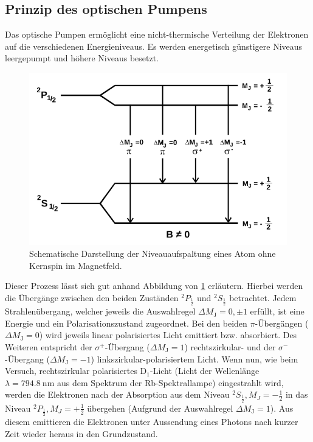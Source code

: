 \subsection{Prinzip des optischen Pumpens}
Das optische Pumpen ermöglicht eine nicht-thermische Verteilung der
Elektronen auf die verschiedenen Energieniveaus. Es werden energetisch
günstigere Niveaus leergepumpt und höhere Niveaus besetzt.
\begin{figure}
  \centering
  \includegraphics[width=0.9\columnwidth]{pictures/niveaus.png}
  \caption{Schematische Darstellung der Niveauaufspaltung eines Atom ohne Kernspin im Magnetfeld.\cite{Anleitung}}
  \label{fig:übergaenge_alkali}
\end{figure}
Dieser Prozess lässt sich gut anhand Abbildung von \ref{fig:übergaenge_alkali}
erläutern.
Hierbei werden die Übergänge zwischen den beiden Zuständen $^2P_{\frac{1}{2}}$ und $^2S_{\frac{1}{2}}$ betrachtet.
Jedem Strahlenübergang, welcher jeweils die Auswahlregel $\Delta M_{\mathrm{J}} = 0, \pm 1$ erfüllt, ist eine Energie und ein Polarisationszustand zugeordnet.
Bei den beiden $\pi$-Übergängen ($\Delta M_{\mathrm{J}} = 0$) wird jeweils linear polarisiertes Licht
emittiert bzw. absorbiert. Des Weiteren entspricht der $\sigma^+$-Übergang ($\Delta M_{\mathrm{J}} = 1$)
rechtszirkular- und der $\sigma^-$-Übergang ($\Delta M_{\mathrm{J}} = -1$) linkszirkular-polarisiertem Licht.
Wenn nun, wie beim Versuch, rechtszirkular polarisiertes D$_1$-Licht (Licht der Wellenlänge $\lambda= \SI{794.8}{\nano\meter}$ aus dem Spektrum der Rb-Spektrallampe)
eingestrahlt wird, werden die Elektronen nach der Absorption aus
dem Niveau $^2S_{\frac{1}{2}}, M_J = -\frac{1}{2}$ in das Niveau
$^2P_{\frac{1}{2}}, M_J = +\frac{1}{2}$ übergehen (Aufgrund der Auswahlregel $\Delta M_{\mathrm{J}} = 1$).
Aus diesem emittieren die Elektronen unter Aussendung eines Photons nach kurzer Zeit wieder heraus in den Grundzustand.\\
